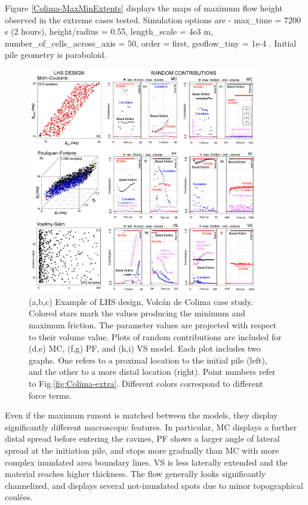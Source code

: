 \documentclass{article}
\begin{document}
Figure \ref{Colima-MaxMinExtents} displays the maps of maximum flow height observed in the extreme cases tested. Simulation options are - max\_time = 7200 s (2 hours), height/radius = 0.55, length\_scale = 4e3 m, number\_of\_cells\_across\_axis = 50, order = first, geoflow\_tiny = 1e-4 \citep{Patra2005,Aghakhani2016}. Initial pile geometry is paraboloid.
\begin{figure}[H]
         \centering
        \includegraphics[width=0.90\textwidth]{figures/Colima/SensitivityFigure.jpg}
        \caption{(a,b,c) Example of LHS design, Volc\'an de Colima case study. Colored stars mark the values producing the minimum and maximum friction. The parameter values are projected with respect to their volume value. Plots of random contributions are included for (d,e) MC, (f,g) PF, and (h,i) VS model. Each plot includes two graphs. One refers to a proximal location to the initial pile (left), and the other to a more distal location (right). Point numbers refer to Fig.\ref{fig:Colima-extra}. Different colors correspond to different force terms.}
        \label{fig:Colima-CC1}
\end{figure}
Even if the maximum runout is matched between the models, they display significantly different macroscopic features. In particular, MC displays a further distal spread before entering the ravines, PF shows a larger angle of lateral spread at the initiation pile, and stops more gradually than MC with more complex inundated area boundary lines. VS is less laterally extended and the material reaches higher thickness. The flow generally looks significantly channelized, and displays several not-inundated spots due to minor topographical coul\'{e}es.
\end{document}
